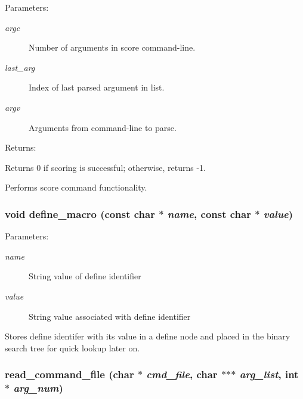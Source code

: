 \begin{Desc}
\item[Parameters: ]\par
\begin{description}
\item[{\em 
argc}]Number of arguments in score command-line. \item[{\em 
last\_\-arg}]Index of last parsed argument in list. \item[{\em 
argv}]Arguments from command-line to parse.\end{description}
\end{Desc}
\begin{Desc}
\item[Returns: ]\par
Returns 0 if scoring is successful; otherwise, returns -1.\end{Desc}
Performs score command functionality. 
\subsubsection{\setlength{\rightskip}{0pt plus 5cm}void define\_\-macro (const char $\ast$ {\em name}, const char $\ast$ {\em value})}\label{score_8c_a9}


\begin{Desc}
\item[Parameters: ]\par
\begin{description}
\item[{\em 
name}]String value of define identifier \item[{\em 
value}]String value associated with define identifier\end{description}
\end{Desc}
Stores define identifer with its value in a define node and placed in the binary search tree for quick lookup later on. 
\subsubsection{ read\_\-command\_\-file (char $\ast$ {\em cmd\_\-file}, char $\ast$$\ast$$\ast$ {\em arg\_\-list}, int $\ast$ {\em arg\_\-num})}\label{score_8c_a11}


